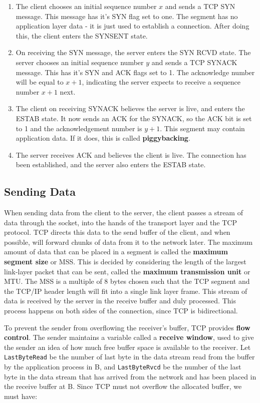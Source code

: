 \documentclass[12pt,letterpaper]{book}
\theoremstyle{definition}
\begin{document}
\begin{enumerate}
  \item The client chooses an initial sequence number $x$ and sends a TCP SYN message. This message has it's SYN flag set to one. The segment has no application layer data - it is just used to establish a connection. After doing this, the client enters the SYNSENT state.
  \item On receiving the SYN message, the server enters the SYN RCVD state. The server chooses an initial sequence number $y$ and sends a TCP SYNACK message. This has it's SYN and ACK flags set to 1. The acknowledge number will be equal to $x+1$, indicating the server expects to receive a sequence number $x+1$ next.
  \item The client on receiving SYNACK believes the server is live, and enters the ESTAB state. It now sends an ACK for the SYNACK, so the ACK bit is set to 1 and the acknowledgement number is $y+1$. This segment may contain application data. If it does, this is called \textbf{piggybacking}.
  \item The server receives ACK and believes the client is live. The connection has been established, and the server also enters the ESTAB state.
\end{enumerate}

\subsection{Sending Data}

When sending data from the client to the server, the client passes a stream of data through the socket, into the hands of the transport layer and the TCP protocol. TCP directs this data to the send buffer of the client, and when possible, will forward chunks of data from it to the network later. The maximum amount of data that can be placed in a segment is called the \textbf{maximum segment size} or MSS. This is decided by considering the length of the largest link-layer packet that can be sent, called the \textbf{maximum transmission unit} or MTU. The MSS is a multiple of 8 bytes chosen such that the TCP segment and the TCP/IP header length will fit into a single link layer frame. This stream of data is received by the server in the receive buffer and duly processed. This process happens on both sides of the connection, since TCP is bidirectional.

To prevent the sender from overflowing the receiver's buffer, TCP provides \textbf{flow control}. The sender maintains a variable called a \textbf{receive window}, used to give the sender an idea of how much free buffer space is available to the receiver. Let \texttt{LastByteRead} be the number of last byte in the data stream read from the buffer by the application process in B, and \texttt{LastByteRvcd} be the number of the last byte in the data stream that has arrived from the network and has been placed in the receive buffer at B. Since TCP must not overflow the allocated buffer, we must have:
\end{document}
